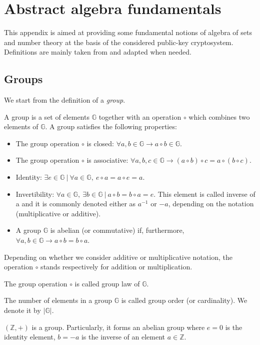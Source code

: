 \chapter{Abstract algebra fundamentals}
\label{app:A}
This appendix is aimed at providing some fundamental notions of  algebra of sets and number theory at the basis of the considered public-key cryptosystem. Definitions are mainly taken from \cite{UnderstandingCrypto} and adapted when needed.
\section{Groups}
We start from the definition of a \textit{group}.
\begin{mydef} A group is a set of elements $\mathbb{G}$ together with an operation $\circ$ which combines two elements of $\mathbb{G}$. A group  satisfies the following properties:
	\begin{itemize}
		\item The group operation $\circ$ is closed: $\forall a, b \in \mathbb{G} \rightarrow a \circ b \in \mathbb{G}$.
		\item The group operation $\circ$ is associative: $\forall a, b, c \in \mathbb{G}  \rightarrow (a \circ b) \circ c = a \circ (b \circ c)$.
		\item Identity: $\exists e \in \mathbb{G} \ | \ \forall a \in \mathbb{G}, \ e \circ a = a \circ e = a$.
		\item Invertibility: $\forall a \in \mathbb{G}, \ \exists b \in \mathbb{G} \ | \ a \circ b = b \circ a = e$. This element is called inverse of a and it is commonly denoted either as $a^{-1}$ or $-a$, depending on the notation (multiplicative or additive).
		\item A group $\mathbb{G}$ is abelian (or commutative) if, furthermore, $\forall a, b \in \mathbb{G} \rightarrow a \circ b = b \circ a$.
	\end{itemize}
\end{mydef}
\label{defA1}
\noindent
Depending on whether we consider additive or multiplicative notation, the operation $\circ$ stands respectively for addition or multiplication.
\begin{myrem} The group operation $\circ$ is called group law of $\mathbb{G}$.
\end{myrem}
\begin{myrem} The number of elements in a group $\mathbb{G}$ is called group order (or cardinality). We denote it by $|\mathbb{G}|$.
\end{myrem}
\begin{myexample}
$(\mathbb{Z},+)$ is a group. Particularly, it forms an abelian group where $e = 0$ is the identity element, $b = -a$ is the inverse of an element $a \in \mathbb{Z}$.
\end{myexample}
